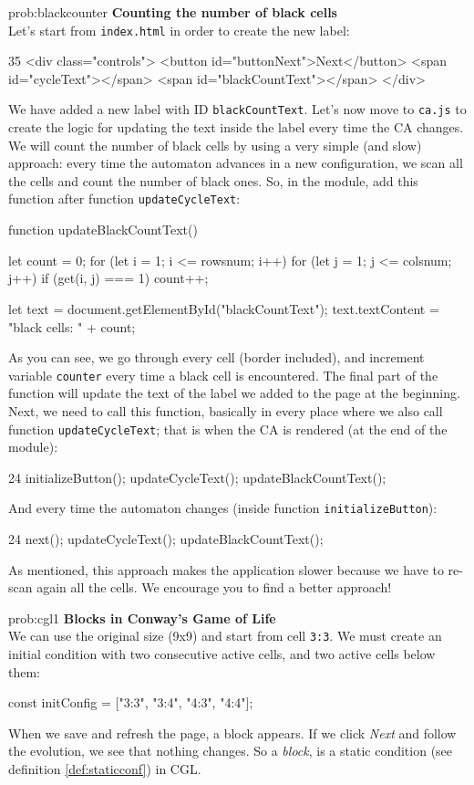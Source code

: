 \begin{sol}{prob:blackcounter}
\textbf{Counting the number of black cells}\\
Let's start from \texttt{index.html} in order to create the new label:
\begin{codehtmlh1}{3}{5}
<div class="controls">
  <button id="buttonNext">Next</button>
  <span id="cycleText"></span>
  <span id="blackCountText"></span>
</div>
\end{codehtmlh1}
We have added a new label with ID \texttt{blackCountText}. Let's now move to \texttt{ca.js} to create the logic for
updating the text inside the label every time the CA changes. We will count the number of black cells by using a
very simple (and slow) approach: every time the automaton advances in a new configuration, we scan all the cells and
count the number of black ones. So, in the module, add this function after function \texttt{updateCycleText}:
\begin{code}
function updateBlackCountText() {
  let count = 0;
  for (let i = 1; i <= rowsnum; i++) {
    for (let j = 1; j <= colsnum; j++) {
      if (get(i, j) === 1) {
          count++;
      }
    }
  }

  let text = document.getElementById("blackCountText");
  text.textContent = "black cells: " + count;
}
\end{code}
As you can see, we go through every cell (border included), and increment variable \texttt{counter} every time
a black cell is encountered. The final part of the function will update the text of the label we added to the
page at the beginning.
Next, we need to call this function, basically in every place where we also call function \texttt{updateCycleText};
that is when the CA is rendered (at the end of the module):
\begin{codeh1}{2}{4}
initializeButton();
updateCycleText();
updateBlackCountText();
\end{codeh1}
And every time the automaton changes (inside function \texttt{initializeButton}):
\begin{codeh1}{2}{4}
next();
updateCycleText();
updateBlackCountText();
\end{codeh1}
As mentioned, this approach makes the application slower because we have to re-scan again all the cells.
We encourage you to find a better approach!
\end{sol}

\begin{sol}{prob:cgl1}
\textbf{Blocks in Conway's Game of Life}\\
We can use the original size (9x9) and start from cell \texttt{3:3}. We must create
an initial condition with two consecutive active cells, and two active cells below them:
\begin{code}
const initConfig = ["3:3", "3:4", "4:3", "4:4"];
\end{code}
When we save and refresh the page, a block appears. If we click \textit{Next} and follow the
evolution, we see that nothing changes. So a \textit{block}, is a static condition
(see definition \ref{def:staticconf}) in CGL.
\end{sol}


